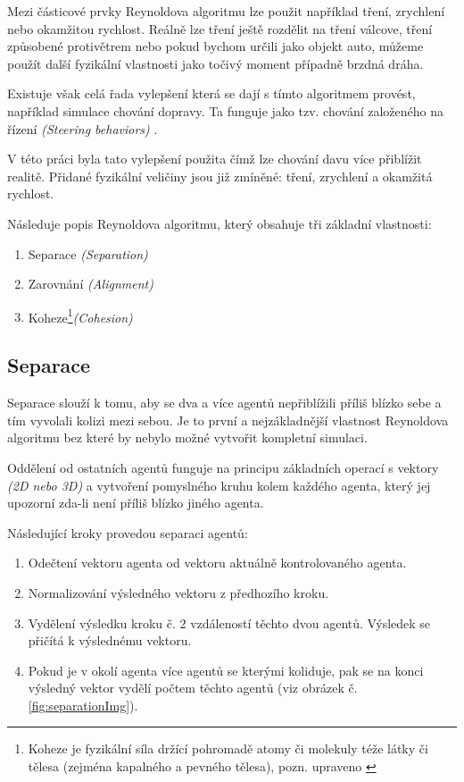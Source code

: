 \documentclass[czech,public,dept460,male,cpdeclaration]{diploma}
\begin{document}
Mezi částicové prvky Reynoldova algoritmu lze použit například tření, zrychlení nebo okamžitou rychlost. Reálně lze tření ještě rozdělit na tření válcove, tření způsobené protivětrem nebo pokud bychom určili jako objekt auto, můžeme použít další fyzikální vlastnosti jako točivý moment případně brzdná dráha.

Existuje však celá řada vylepšení která se dají s tímto algoritmem provést, například simulace chování dopravy. Ta funguje jako tzv. chování založeného na řízení \textit{(Steering behaviors)} \cite{linkToSteeringBehaviors}. 

V této práci byla tato vylepšení použita čímž lze chování davu více přiblížit realitě. Přidané fyzikální veličiny jsou již zmíněné: tření, zrychlení a okamžitá rychlost.

\newpage
Následuje popis Reynoldova algoritmu, který obsahuje tři základní vlastnosti:

\begin{enumerate}
	\item Separace \textit{(Separation)}
	\item Zarovnání \textit{(Alignment)}
	\item Koheze\footnote{Koheze je fyzikální síla držící pohromadě atomy či molekuly téže látky či tělesa (zejména
		kapalného a pevného tělesa), pozn. upraveno \cite{linkToCohesion}}\textit{(Cohesion)}
\end{enumerate}

\subsection{Separace}\label{sec:separace}
Separace slouží k tomu, aby se dva a více agentů nepřiblížili příliš blízko sebe a tím vyvolali kolizi mezi sebou. Je to první a nejzákladnější vlastnost Reynoldova algoritmu bez které by nebylo možné vytvořit kompletní simulaci. 

Oddělení od ostatních agentů funguje na principu základních operací s vektory \textit{(2D nebo 3D)} a vytvoření pomyslného kruhu kolem každého agenta, který jej upozorní zda-li není příliš blízko jiného agenta. 

Následující kroky provedou separaci agentů: 

\begin{enumerate}
	\item Odečtení vektoru agenta od vektoru aktuálně kontrolovaného agenta.
	\item Normalizování výsledného vektoru z předhozího kroku.
	\item Vydělení výsledku kroku č. 2 vzdáleností těchto dvou agentů. Výsledek se přičítá k výslednému vektoru.
	\item Pokud je v okolí agenta více agentů se kterými koliduje, pak se na konci výsledný vektor vydělí počtem těchto agentů (viz obrázek č. \ref{fig:separationImg}).
\end{enumerate}
\end{document}
